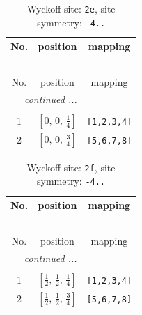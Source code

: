 \documentclass[fleqn,8pt]{jsarticle}
\begin{document}
\begin{longtable}{ccc}
\caption{Wyckoff site: {\tt 2e}, site symmetry: {\tt -4..}}
 \\
 \hline \hline
No. & position & mapping \\ \hline \endfirsthead

\multicolumn{2}{l}{\tablename\ \thetable{}} \\
 \hline \hline
No. & position & mapping \\ \hline \endhead

 \hline \hline
\multicolumn{2}{r}{\footnotesize\it continued ...} \\ \endfoot

 \hline \hline
\multicolumn{2}{r}{} \\ \endlastfoot

1 & $\left[ 0,\, 0,\, \frac{1}{4} \right]$ & {\tt [1,2,3,4]} \\ \hline
2 & $\left[ 0,\, 0,\, \frac{3}{4} \right]$ & {\tt [5,6,7,8]} \\
\end{longtable}
\renewcommand{\arraystretch}{1.2}
\begin{longtable}{ccc}
\caption{Wyckoff site: {\tt 2f}, site symmetry: {\tt -4..}}
 \\
 \hline \hline
No. & position & mapping \\ \hline \endfirsthead

\multicolumn{2}{l}{\tablename\ \thetable{}} \\
 \hline \hline
No. & position & mapping \\ \hline \endhead

 \hline \hline
\multicolumn{2}{r}{\footnotesize\it continued ...} \\ \endfoot

 \hline \hline
\multicolumn{2}{r}{} \\ \endlastfoot

1 & $\left[ \frac{1}{2},\, \frac{1}{2},\, \frac{1}{4} \right]$ & {\tt [1,2,3,4]} \\ \hline
2 & $\left[ \frac{1}{2},\, \frac{1}{2},\, \frac{3}{4} \right]$ & {\tt [5,6,7,8]} \\
\end{longtable}
\renewcommand{\arraystretch}{1.2}
\end{document}
